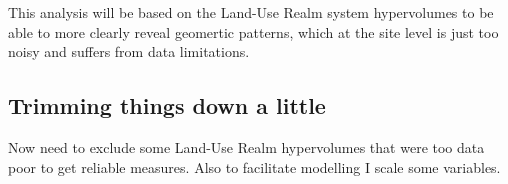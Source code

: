 \documentclass[
]{article}
\newenvironment{Shaded}{\begin{snugshade}}{\end{snugshade}}
\newcommand{\AttributeTok}[1]{\textcolor[rgb]{0.77,0.63,0.00}{#1}}
\newcommand{\FunctionTok}[1]{\textcolor[rgb]{0.00,0.00,0.00}{#1}}
\newcommand{\NormalTok}[1]{#1}
\newcommand{\OtherTok}[1]{\textcolor[rgb]{0.56,0.35,0.01}{#1}}
\newcommand{\SpecialCharTok}[1]{\textcolor[rgb]{0.00,0.00,0.00}{#1}}
\newcommand{\StringTok}[1]{\textcolor[rgb]{0.31,0.60,0.02}{#1}}
\begin{document}
This analysis will be based on the Land-Use Realm system hypervolumes to
be able to more clearly reveal geomertic patterns, which at the site
level is just too noisy and suffers from data limitations.

\hypertarget{trimming-things-down-a-little}{%
\subsection{Trimming things down a
little}\label{trimming-things-down-a-little}}

Now need to exclude some Land-Use Realm hypervolumes that were too data
poor to get reliable measures. Also to facilitate modelling I scale some
variables.

\begin{Shaded}
\end{Shaded}
\end{document}
